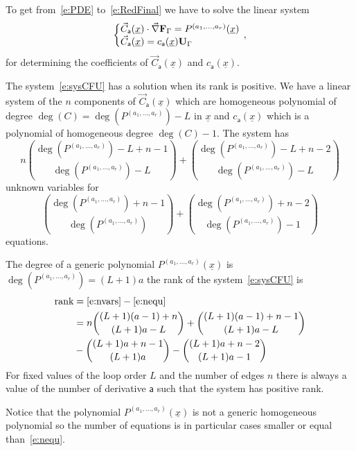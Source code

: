 \documentclass[a4paper,12pt]{article}
\numberwithin{equation}{section}
\numberwithin{figure}{section}
\begin{document}
To get from~\eqref{e:PDE} to~\eqref{e:RedFinal} we have to solve the linear system
\begin{equation}\label{e:sysCFU}
   \left\{\begin{array}{@{}l@{}}
\vec C_{\mathsf{a}} (\underline x) \cdot \vec \nabla \textbf{F}_\Gamma
            =    P^{(a_1,\dots,a_r)}(\underline x)\\
\vec C_{\mathsf{a}} (\underline x)= c_{{\mathsf{a}}}(\underline x) \textbf{U}_\Gamma 
  \end{array}\right.\,,
\end{equation}
for determining the coefficients of $\vec C_{\mathsf{a}}(\underline
x)$ and $c_{\mathsf{a}}(\underline x)$.

The system~\eqref{e:sysCFU} has a solution when its rank is positive.
We have a linear system of the $n$ components of $\vec C_{\mathsf{a}}(\underline
x) $ which are homogeneous polynomial of degree $\deg(C)=\deg( P^{(a_1,\dots,a_r)})-L $ in
$\underline x$ and  $ c_{{\mathsf{a}}}(\underline x) $ which is a polynomial of
homogeneous degree $\deg(C)-1$.   The system has
\begin{equation}\label{e:nvars}
n \binom{\deg( P^{(a_1,\dots,a_r)})-L+n-1}{\deg( P^{(a_1,\dots,a_r)})-L}+\binom{\deg( P^{(a_1,\dots,a_r)})-L+n-2}{\deg( P^{(a_1,\dots,a_r)})-L}
\end{equation} unknown variables for
\begin{equation}\label{e:nequ}
\binom{\deg( P^{(a_1,\dots,a_r)})+n-1}{\deg( P^{(a_1,\dots,a_r)})}+\binom{\deg( P^{(a_1,\dots,a_r)})+n-2}{\deg( P^{(a_1,\dots,a_r)})-1}
\end{equation}
equations.


The degree of a generic polynomial $ P^{(a_1,\dots,a_r)}(\underline x)$ is $\deg(
 P^{(a_1,\dots,a_r)})=(L+1)a$ 
 the rank of the system~\eqref{e:sysCFU} is
  \begin{align}
    \label{e:Rank}
    \textrm{rank}&=\eqref{e:nvars}-\eqref{e:nequ}\\
\nonumber    &=n \binom{(L+1)(a-1)+n
               }{(L+1)a-L}+\binom{(L+1)(a-1)+n-1}{(L+1)a-L}\cr
             \nonumber    &
                              -\binom{(L+1)a+n-1}{(L+1)a}-\binom{(L+1)a+n-2}{(L+1)a-1}
  \end{align}
For fixed values of the loop order $L$
and the number of edges $n$ there is always a value of the
number of derivative $\mathsf{a}$ such that the system has
positive rank.

Notice that the polynomial $ P^{(a_1,\dots,a_r)}(\underline x)$ is not a generic
homogeneous polynomial so the number of equations is in particular
cases smaller or equal than~\eqref{e:nequ}.
\end{document}

